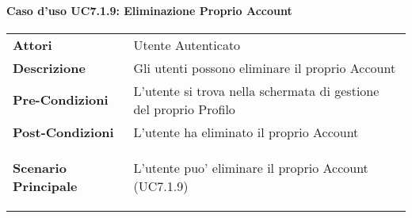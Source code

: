 \paragraph{Caso d'uso UC7.1.9:  Eliminazione Proprio Account}
\label{UC7_1_9}

\begin{tabular}{ l | p{11cm}}
	\hline
	\rowcolor{Gray}
	 \multicolumn{2}{c}{UC7.1.9 - Eliminazione Proprio Account} \\
	 \hline
	\textbf{Attori} & Utente Autenticato \\
	\textbf{Descrizione} & Gli utenti possono eliminare il proprio Account\\
	\textbf{Pre-Condizioni} & L'utente si trova nella schermata di gestione del proprio Profilo\\
	\textbf{Post-Condizioni} & L'utente ha eliminato il proprio Account \\
	\textbf{Scenario Principale} & 
	\begin{enumerate*}[label=(\arabic*.),itemjoin={\newline}]
		\item L'utente puo' eliminare il proprio Account (UC7.1.9)
	\end{enumerate*}\\
\end{tabular}
